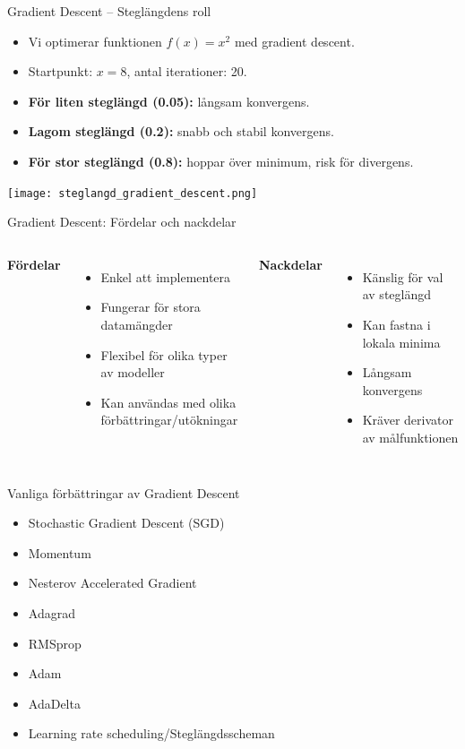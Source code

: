 \documentclass[10pt,english]{beamer}
\begin{document}
\begin{frame}{Gradient Descent – Steglängdens roll}
  \begin{itemize}
    \item Vi optimerar funktionen $f(x) = x^2$ med gradient descent.
    \item Startpunkt: $x = 8$, antal iterationer: 20.
    \item \textbf{För liten steglängd (0.05):} långsam konvergens.
    \item \textbf{Lagom steglängd (0.2):} snabb och stabil konvergens.
    \item \textbf{För stor steglängd (0.8):} hoppar över minimum, risk för divergens.
  \end{itemize}
  \begin{center}
    \texttt{[image: steglangd\_gradient\_descent.png]}
  \end{center}
\end{frame}

\begin{frame}{Gradient Descent: Fördelar och nackdelar}
  \begin{columns}
    \textbf{Fördelar}
    \begin{itemize}
      \item Enkel att implementera
      \item Fungerar för stora datamängder
      \item Flexibel för olika typer av modeller
      \item Kan användas med olika förbättringar/utökningar
    \end{itemize}

    \textbf{Nackdelar}
    \begin{itemize}
      \item Känslig för val av steglängd
      \item Kan fastna i lokala minima
      \item Långsam konvergens
      \item Kräver derivator av målfunktionen
    \end{itemize}
  \end{columns}
\end{frame}

\begin{frame}{Vanliga förbättringar av Gradient Descent}
  \begin{itemize}
    \item Stochastic Gradient Descent (SGD)
    \item Momentum
    \item Nesterov Accelerated Gradient
    \item Adagrad
    \item RMSprop
    \item Adam
    \item AdaDelta
    \item Learning rate scheduling/Steglängdsscheman
  \end{itemize}
\end{frame}
\end{document}
